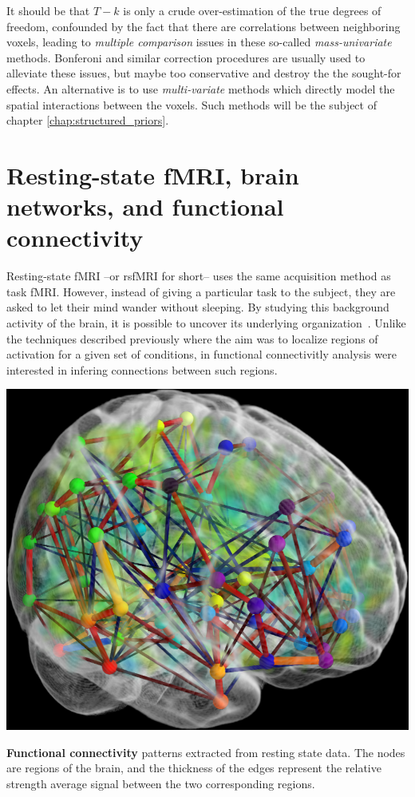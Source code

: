 It should be that $T-k$ is only a crude over-estimation of the true degrees of freedom, confounded by the fact that there are correlations between neighboring voxels, leading to \textit{multiple comparison} issues in these so-called \textit{mass-univariate} methods. Bonferoni and similar correction procedures are usually used to alleviate these issues, but maybe too conservative and destroy the the sought-for effects. An alternative is to use \textit{multi-variate} methods which directly model the spatial interactions between the voxels. Such methods will be the subject of chapter \ref{chap:structured_priors}.

\section{Resting-state fMRI, brain networks, and functional connectivity}
\label{sec:rsfmri}
Resting-state fMRI --or rsfMRI for short-- uses the same acquisition method as task fMRI.
However, instead of giving a particular task to the subject, they are asked to let their mind wander without sleeping. By studying this background activity of
the brain, it is possible to uncover its underlying organization~\citep{raichle10}. Unlike the techniques described previously where the aim was to localize regions of activation for a given set of conditions, in functional connectivitly analysis were interested in infering connections between such regions.

\begin{marginfigure}%
  \includegraphics[width=1\linewidth]{figures/connectome.png}
  \caption{\textbf{Functional connectivity} patterns extracted from resting state data. The nodes are regions of the brain, and the thickness
  of the edges represent the relative strength average signal between the two corresponding regions.}
\end{marginfigure}


